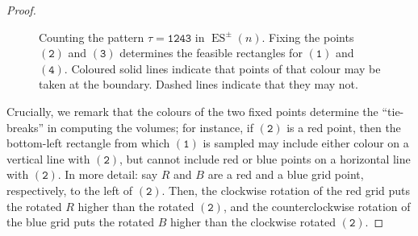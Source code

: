 \documentclass{article}
\DeclareMathOperator{\ES}{ES}
\theoremstyle{remark}
\newcommand{\perm}[1]{(\mathtt{ #1 })}
\theoremstyle{plain}
\begin{document}
\begin{proof}
\begin{figure}[H]
        \caption{Counting the pattern $\tau = \mathtt{1243}$ in $\ES^\pm(n)$. Fixing the points $\perm{2}$ and $\perm{3}$ determines the feasible rectangles for $\perm{1}$ and $\perm{4}$. Coloured solid lines indicate that points of that colour may be taken at the boundary. Dashed lines indicate that they may not. }
        \label{fig:count_1243_es_pm}
    \end{figure}

    Crucially, we remark that the colours of the two fixed points determine the ``tie-breaks'' in computing the volumes; for instance, if $\perm{2}$ is a red point, then the bottom-left rectangle from which $\perm{1}$ is sampled may include either colour on a vertical line with $\perm{2}$, but cannot include red or blue points on a horizontal line with $\perm{2}$. In more detail: say $R$ and $B$ are a red and a blue grid point, respectively, to the left of $\perm{2}$. Then, the clockwise rotation of the red grid puts the rotated $R$ higher than the rotated $\perm{2}$, and the counterclockwise rotation of the blue grid puts the rotated $B$ higher than the clockwise rotated $\perm{2}$.


\end{proof}
\end{document}
